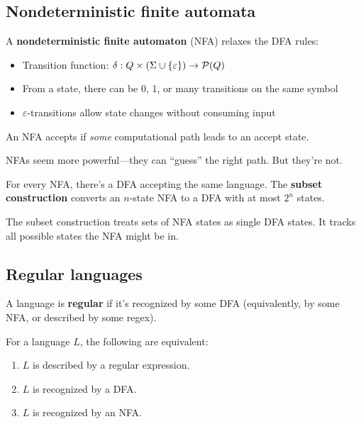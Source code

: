 \subsection*{Nondeterministic finite automata}

\begin{definition}[NFA]
A \textbf{nondeterministic finite automaton} (NFA) relaxes the DFA rules:
\begin{itemize}
  \item Transition function: $\delta: Q \times (\Sigma \cup \{\varepsilon\}) \to \mathcal{P}(Q)$
  \item From a state, there can be 0, 1, or many transitions on the same symbol
  \item $\varepsilon$-transitions allow state changes without consuming input
\end{itemize}
An NFA accepts if \emph{some} computational path leads to an accept state.
\end{definition}

NFAs seem more powerful---they can ``guess'' the right path. But they're not.

\begin{theorem}
For every NFA, there's a DFA accepting the same language. The \textbf{subset construction} converts an $n$-state NFA to a DFA with at most $2^n$ states.
\end{theorem}

The subset construction treats sets of NFA states as single DFA states. It tracks all possible states the NFA might be in.

\subsection*{Regular languages}

\begin{definition}
A language is \textbf{regular} if it's recognized by some DFA (equivalently, by some NFA, or described by some regex).
\end{definition}

\begin{theorem}
For a language $L$, the following are equivalent:
\begin{enumerate}
  \item $L$ is described by a regular expression.
  \item $L$ is recognized by a DFA.
  \item $L$ is recognized by an NFA.
\end{enumerate}
\end{theorem}

